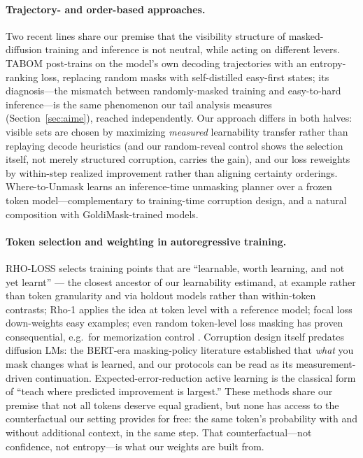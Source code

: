\documentclass{article} %
\begin{document}
\paragraph{Trajectory- and order-based approaches.} Two recent lines share our premise that the visibility structure of masked-diffusion training and inference is not neutral, while acting on different levers. TABOM \citep{chen2026tabom} post-trains on the model's own decoding trajectories with an entropy-ranking loss, replacing random masks with self-distilled easy-first states; its diagnosis---the mismatch between randomly-masked training and easy-to-hard inference---is the same phenomenon our tail analysis measures (Section~\ref{sec:aime}), reached independently. Our approach differs in both halves: visible sets are chosen by maximizing \emph{measured} learnability transfer rather than replaying decode heuristics (and our random-reveal control shows the selection itself, not merely structured corruption, carries the gain), and our loss reweights by within-step realized improvement rather than aligning certainty orderings. Where-to-Unmask \citep{asano2026unmask} learns an inference-time unmasking planner over a frozen token model---complementary to training-time corruption design, and a natural composition with GoldiMask-trained models.

\paragraph{Token selection and weighting in autoregressive training.} RHO-LOSS \citep{mindermann2022prioritized} selects training points that are ``learnable, worth learning, and not yet learnt'' --- the closest ancestor of our learnability estimand, at example rather than token granularity and via holdout models rather than within-token contrasts; Rho-1 \citep{lin2024rho} applies the idea at token level with a reference model; focal loss \citep{lin2017focal} down-weights easy examples; even random token-level loss masking has proven consequential, e.g.\ for memorization control \citep{hans2025goldfish}. Corruption design itself predates diffusion LMs: the BERT-era masking-policy literature \citep{levine2021pmi,wettig2023mask} established that \emph{what} you mask changes what is learned, and our protocols can be read as its measurement-driven continuation. Expected-error-reduction active learning \citep{settles2009active} is the classical form of ``teach where predicted improvement is largest.'' These methods share our premise that not all tokens deserve equal gradient, but none has access to the counterfactual our setting provides for free: the same token's probability with and without additional context, in the same step. That counterfactual---not confidence, not entropy---is what our weights are built from.
\end{document}
